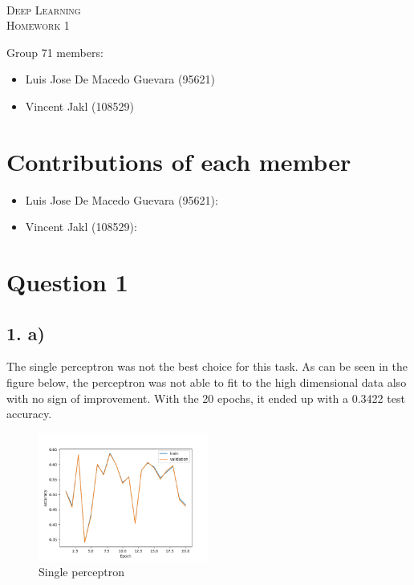 \documentclass[11pt]{article}
\begin{document}
\begin{center}
  \mbox{}\\[2.0cm]
  \textsc{\Huge Deep Learning}\\[1.0cm]
  \textsc{\Large Homework 1}\\[0.5cm]
\end{center}
\begin{flushleft}
  Group 71 members: \\[0.5cm]
  \begin{itemize}
  \item Luis Jose De Macedo Guevara (95621)
  \item Vincent Jakl (108529)
  \end{itemize}
\end{flushleft}

\section{Contributions of each member}
\begin{itemize}
    \item Luis Jose De Macedo Guevara (95621):
    \item Vincent Jakl (108529):
\end{itemize}
\pagebreak
\section{Question 1}
\subsection{1. a)}
The single perceptron was not the best choice for this task.
As can be seen in the figure below, the perceptron was not able to fit to the high dimensional data also with no sign of improvement.
With the 20 epochs, it ended up with a 0.3422 test accuracy.
\begin{figure}[h!]
  \centering
  \includegraphics[width=0.5\textwidth]{./plots/single_perceptron.png}
  \caption{Single perceptron}\label{fig:single_layer_perceptron}
\end{figure}
\end{document}
